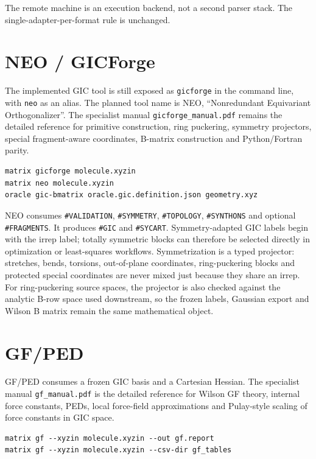 \documentclass[11pt]{article}
\newcommand{\sectionname}[1]{\texttt{\##1}}
\begin{document}
The remote machine is an execution backend, not a second parser stack.  The
single-adapter-per-format rule is unchanged.

\section{NEO / GICForge}

The implemented GIC tool is still exposed as \texttt{gicforge} in the command
line, with \texttt{neo} as an alias.  The planned tool name is NEO,
``Nonredundant Equivariant Orthogonalizer''.  The specialist manual
\texttt{gicforge\_manual.pdf} remains the detailed reference for primitive
construction, ring puckering, symmetry projectors, special fragment-aware
coordinates, B-matrix construction and Python/Fortran parity.

\begin{lstlisting}[style=matrix]
matrix gicforge molecule.xyzin
matrix neo molecule.xyzin
oracle gic-bmatrix oracle.gic.definition.json geometry.xyz
\end{lstlisting}

NEO consumes \sectionname{VALIDATION}, \sectionname{SYMMETRY},
\sectionname{TOPOLOGY}, \sectionname{SYNTHONS} and optional
\sectionname{FRAGMENTS}.  It produces \sectionname{GIC} and
\sectionname{SYCART}.  Symmetry-adapted GIC labels begin with the irrep label;
totally symmetric blocks can therefore be selected directly in optimization or
least-squares workflows.  Symmetrization is a typed projector: stretches,
bends, torsions, out-of-plane coordinates, ring-puckering blocks and protected
special coordinates are never mixed just because they share an irrep.  For
ring-puckering source spaces, the projector is also checked against the
analytic B-row space used downstream, so the frozen labels, Gaussian export and
Wilson B matrix remain the same mathematical object.

\section{GF/PED}

GF/PED consumes a frozen GIC basis and a Cartesian Hessian.  The specialist
manual \texttt{gf\_manual.pdf} is the detailed reference for Wilson GF theory,
internal force constants, PEDs, local force-field approximations and
Pulay-style scaling of force constants in GIC space.

\begin{lstlisting}[style=matrix]
matrix gf --xyzin molecule.xyzin --out gf.report
matrix gf --xyzin molecule.xyzin --csv-dir gf_tables
\end{lstlisting}
\end{document}
